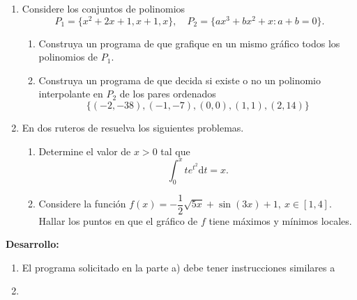 \documentclass[letter,11pt]{article}
\begin{document}
\begin{enumerate}

\item Considere los conjuntos de polinomios
$$
P_1=\{x^2+2x+1,x+1,x\}, \quad
P_2=\{ax^3+bx^2+x: a+b=0\}.
$$
\begin{enumerate}
  \item {} Construya un programa de \octave que grafique en un mismo gr\'afico todos los polinomios de $P_1$.

 \item {} Construya un programa de \octave que decida si existe o no un polinomio interpolante en $P_2$ de los pares ordenados
 $$
 \{(-2,-38),(-1,-7),(0,0),(1,1),(2,14)\}
 $$
\end{enumerate}

\item En dos ruteros de \octave resuelva los siguientes problemas.
\begin{enumerate}
    \item {} Determine el valor de $x>0$ tal que 
    \begin{equation*}
        \int_{0}^{x} t e^{t^2}\text{d}t = x.
    \end{equation*}
    \item {} Considere la funci\'on $f(x) = -\dfrac{1}{2}\sqrt{5x} + \sin(3x) + 1, \ x\in [1,4]$. Hallar los puntos en que el gr\'afico de $f$ tiene m\'aximos y m\'inimos locales.
\end{enumerate}
\end{enumerate}

\textbf{Desarrollo:}
\begin{enumerate}
    \item El programa solicitado en la parte a) debe tener instrucciones similares a
    
    \item
\end{enumerate}
\end{document}

